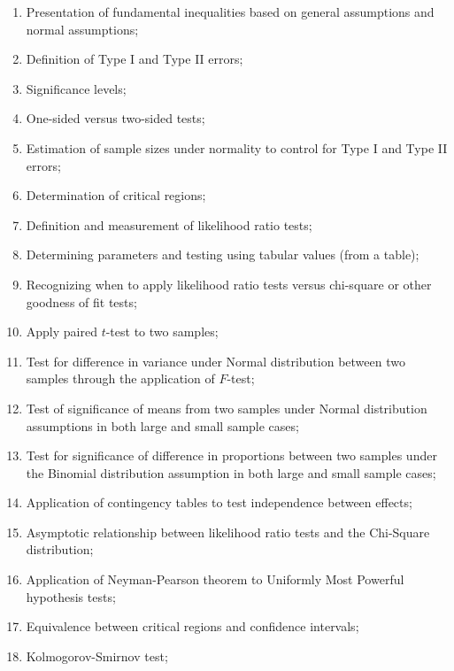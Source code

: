\begin{knowledge}
	\begin{enumerate}[label = \alph*.]
	\item	Presentation of fundamental inequalities based on general assumptions and normal assumptions;
	\item	Definition of Type I and Type II errors;
	\item	Significance levels;
	\item	One-sided versus two-sided tests;
	\item	Estimation of sample sizes under normality to control for Type I and Type II errors;
	\item	Determination of critical regions;
	\item	Definition and measurement of likelihood ratio tests;
	\item	Determining parameters and testing using tabular values (from a table);
	\item	Recognizing when to apply likelihood ratio tests versus chi-square or other goodness of fit tests;
	\item	Apply paired $t$-test to two samples;
	\item	Test for difference in variance under Normal distribution between two samples through the application of $F$-test;
	\item	Test of significance of means from two samples under Normal distribution assumptions in both large and small sample cases;
	\item	Test for significance of difference in proportions between two samples under the Binomial distribution assumption in both large and small sample cases;
	\item	Application of contingency tables to test independence between effects;
	\item	Asymptotic relationship between likelihood ratio tests and the Chi-Square distribution;
	\item	Application of Neyman-Pearson theorem to Uniformly Most Powerful hypothesis tests;
	\item	Equivalence between critical regions and confidence intervals;
	\item	Kolmogorov-Smirnov test;
	\end{enumerate}
\end{knowledge}
	

